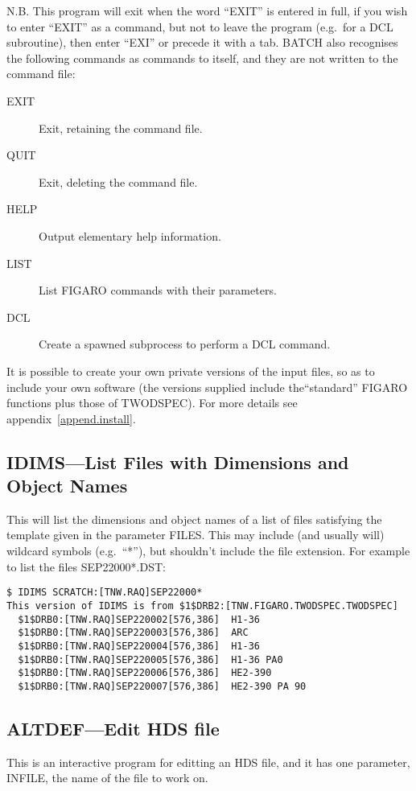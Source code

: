 N.B. This program will exit when the word ``EXIT'' is entered in full,
if you wish to enter ``EXIT'' as a command, but not to leave the program
(e.g.\ for a DCL subroutine), then enter ``EXI'' or precede it with a
tab. BATCH also recognises the following commands as commands to itself,
and they are not written to the command file:
\begin{description}
\item[EXIT] Exit, retaining the command file.
\item[QUIT] Exit, deleting the command file.
\item[HELP] Output elementary help information.
\item[LIST] List FIGARO commands with their parameters.
\item[DCL] Create a spawned subprocess to perform a DCL command.
\end{description}

It is possible to create your own private versions of the input files,
so as to include your own software (the versions supplied include
the``standard'' FIGARO functions plus those of TWODSPEC).
For more details see appendix~\ref{append.install}.

\subsection{IDIMS---List Files with Dimensions and Object Names}

This will list the dimensions and object names of a list of files
satisfying the template given in the parameter FILES. This may include
(and usually will) wildcard symbols (e.g.\ ``*''), but shouldn't include
the file extension. For example to list the files SEP22000*.DST:
\begin{verbatim}
$ IDIMS SCRATCH:[TNW.RAQ]SEP22000*
This version of IDIMS is from $1$DRB2:[TNW.FIGARO.TWODSPEC.TWODSPEC]
  $1$DRB0:[TNW.RAQ]SEP220002[576,386]  H1-36
  $1$DRB0:[TNW.RAQ]SEP220003[576,386]  ARC
  $1$DRB0:[TNW.RAQ]SEP220004[576,386]  H1-36
  $1$DRB0:[TNW.RAQ]SEP220005[576,386]  H1-36 PA0
  $1$DRB0:[TNW.RAQ]SEP220006[576,386]  HE2-390
  $1$DRB0:[TNW.RAQ]SEP220007[576,386]  HE2-390 PA 90
\end{verbatim}

\subsection{ALTDEF---Edit HDS file}
\label{altdef}

This is an interactive program for editting an HDS file, and it has one
parameter, INFILE, the name of the file to work on.

